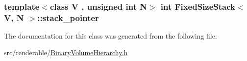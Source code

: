 \subsubsection[{\texorpdfstring{stack\+\_\+pointer}{stack_pointer}}]{\setlength{\rightskip}{0pt plus 5cm}template$<$class V , unsigned int N$>$ int {\bf Fixed\+Size\+Stack}$<$ V, N $>$\+::stack\+\_\+pointer\hspace{0.3cm}{\ttfamily [private]}}\hypertarget{classFixedSizeStack_a87e0a013c62888f127f57309e32ed70e}{}\label{classFixedSizeStack_a87e0a013c62888f127f57309e32ed70e}


The documentation for this class was generated from the following file\+:\begin{DoxyCompactItemize}
\item 
src/renderable/\hyperlink{BinaryVolumeHierarchy_8h}{Binary\+Volume\+Hierarchy.\+h}\end{DoxyCompactItemize}

